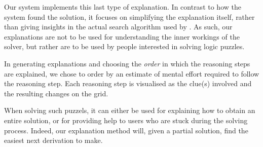 Our system implements this last type of explanation. In contrast to how the system found the solution, it focuses on simplifying the explanation itself, rather than giving insights in the actual search algorithm used by \idp. As such, our explanations are not to be used for understanding the inner workings of the solver, but rather are to be used by people interested in solving logic puzzles.

In generating explanations and choosing the \textit{order} in which the reasoning steps are explained, we chose to order by an estimate of mental effort required to follow the reasoning step. Each reasoning step is visualised as the clue(s) involved and the resulting changes on the grid.

When solving such puzzels, it can either be used for explaining how to obtain an entire solution, or for providing help to users who are stuck during the solving process. Indeed, our explanation method will, given a partial solution, find the easiest next derivation to make. 

